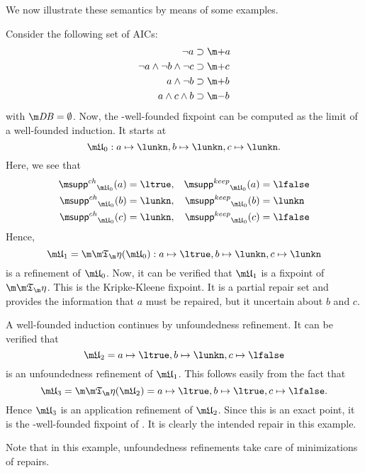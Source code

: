 We now illustrate these semantics by means of some examples. 

\begin{example}
 Consider the following set \aics of AICs:
\begin{align*}
 \lnot a &\aicrule \add a \\ 
 \lnot a \land \lnot b \land \lnot c &\aicrule \add c\\
 a \land \lnot b &\aicrule \add b \\
 a \land c \land b &\aicrule \remove b
\end{align*} with $\db = \emptyset$.
Now, the \Ap-well-founded fixpoint can be computed as the limit of a well-founded induction. It starts at
\[\UUU_0: a\mapsto \lunkn, b\mapsto \lunkn, c\mapsto\lunkn.\]
Here, we see that 
\begin{align*}
 \suppin_{\UUU_0}(a) &= \ltrue, & \suppout_{\UUU_0}(a) &=\lfalse \\
 \suppin_{\UUU_0}(b) &= \lunkn, & \suppout_{\UUU_0}(b) &=\lunkn \\
 \suppin_{\UUU_0}(c) &= \lunkn, & \suppout_{\UUU_0}(c) &=\lfalse 
\end{align*}
Hence, 
\[\UUU_1 = \Ap(\UUU_0): a\mapsto \ltrue, b\mapsto \lunkn, c\mapsto\lunkn\]
is a refinement of $\UUU_0$. 
Now, it can be verified that $\UUU_1$ is a fixpoint of $\Ap$. This is the Kripke-Kleene fixpoint. It is a partial repair set and provides the information that $a$ must be repaired, but it uncertain about $b$ and $c$. 

A well-founded induction continues by unfoundedness refinement. 
It can be verified that 
\[\UUU_2 = a\mapsto \ltrue, b\mapsto \lunkn, c\mapsto\lfalse\]
is an unfoundedness refinement of $\UUU_1$.
This follows easily from the fact that 
\[\UUU_3 = \Ap(\UUU_2)= a\mapsto \ltrue, b\mapsto \ltrue, c\mapsto\lfalse.\]
Hence $\UUU_3$ is an application refinement of $\UUU_2$. Since this is an exact point, it is the \Ap-well-founded fixpoint of \Op. It is clearly the intended repair in this example.

Note that in this example, unfoundedness refinements take care of minimizations of repairs.  
\end{example}



